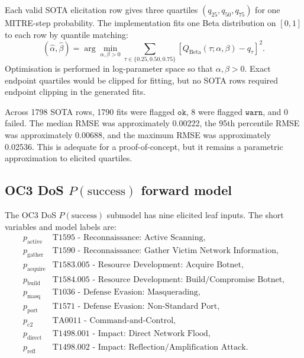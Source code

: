 \documentclass[11pt]{article}
\newcommand{\psuccess}{P(\mathrm{success})}
\begin{document}
Each valid SOTA elicitation row gives three quartiles \((q_{25},q_{50},q_{75})\) for one MITRE-step probability. The implementation fits one Beta distribution on \([0,1]\) to each row by quantile matching:
\[
(\hat{\alpha},\hat{\beta})
=
\arg\min_{\alpha,\beta>0}
\sum_{\tau \in \{0.25,0.50,0.75\}}
\left[
Q_{\mathrm{Beta}}(\tau;\alpha,\beta)-q_{\tau}
\right]^2.
\]
Optimisation is performed in log-parameter space so that \(\alpha,\beta>0\). Exact endpoint quartiles would be clipped for fitting, but no SOTA rows required endpoint clipping in the generated fits.

Across 1798 SOTA rows, 1790 fits were flagged \(\texttt{ok}\), 8 were flagged \(\texttt{warn}\), and 0 failed. The median RMSE was approximately 0.00222, the 95th percentile RMSE was approximately 0.00688, and the maximum RMSE was approximately 0.02536. This is adequate for a proof-of-concept, but it remains a parametric approximation to elicited quartiles.

\subsection{OC3 DoS \texorpdfstring{$P(\mathrm{success})$}{P(success)} forward model}

The OC3 DoS \(\psuccess\) submodel has nine elicited leaf inputs. The short variables and model labels are:
\[
\begin{array}{ll}
p_{\mathrm{active}} & \text{T1595 - Reconnaissance: Active Scanning},\\
p_{\mathrm{gather}} & \text{T1590 - Reconnaissance: Gather Victim Network Information},\\
p_{\mathrm{acquire}} & \text{T1583.005 - Resource Development: Acquire Botnet},\\
p_{\mathrm{build}} & \text{T1584.005 - Resource Development: Build/Compromise Botnet},\\
p_{\mathrm{masq}} & \text{T1036 - Defense Evasion: Masquerading},\\
p_{\mathrm{port}} & \text{T1571 - Defense Evasion: Non-Standard Port},\\
p_{\mathrm{c2}} & \text{TA0011 - Command-and-Control},\\
p_{\mathrm{direct}} & \text{T1498.001 - Impact: Direct Network Flood},\\
p_{\mathrm{refl}} & \text{T1498.002 - Impact: Reflection/Amplification Attack}.
\end{array}
\]
\end{document}
